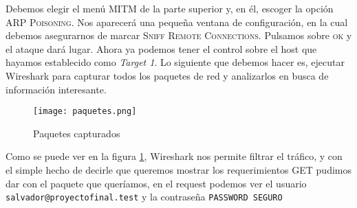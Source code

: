 Debemos elegir el menú \textsc{MITM} de la parte superior y, en él, 
escoger la opción \textsc{ARP Poisoning}. Nos aparecerá una pequeña ventana de configuración, 
en la cual debemos asegurarnos de marcar \textsc{Sniff Remote Connections}.
Pulsamos sobre \textsc{ok} y el ataque dará lugar. Ahora ya podemos tener el control 
sobre el host que hayamos establecido como \emph{Target 1}. Lo siguiente que debemos 
hacer es, ejecutar Wireshark para capturar todos los paquetes de 
red y analizarlos en busca de información interesante.

\begin{center}
   \begin{figure}   
      \begin{center}
         \texttt{[image: paquetes.png]}
      \end{center}
      \caption{Paquetes capturados}
      \label{pacCap}
   \end{figure}
\end{center}

Como se puede ver en la figura \ref{pacCap}, Wireshark nos permite filtrar el tráfico, y con el 
simple hecho de decirle que queremos mostrar los requerimientos GET
pudimos dar con el paquete que queríamos, en el request podemos ver
el usuario \texttt{salvador@proyectofinal.test} y la contraseña \texttt{PASSWORD SEGURO}
